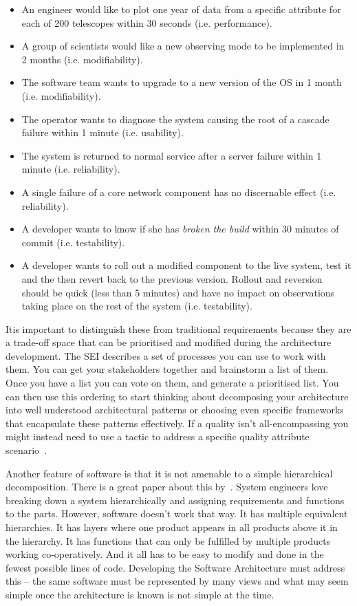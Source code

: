 \documentclass[11pt,twoside]{article}
\begin{document}
\begin{itemize}
	\item An engineer would like to plot one year of data from a specific attribute for each 
of 200 telescopes within 30 seconds (i.e. performance).
	\item A group of scientists would like a new observing mode to be implemented in 2 
months (i.e. modifiability). 
	\item The software team wants to upgrade to a new version of the OS in 1 month (i.e. 
modifiability). 
	\item The operator wants to diagnose the system causing the root of a cascade failure 
within 1 minute (i.e. usability). 
	\item The system is returned to normal service after a server failure within 1 minute 
(i.e. reliability). 
	\item A single failure of a core network component has no discernable effect (i.e. reliability). 
	\item A developer wants to know if she has \emph{broken the build} within 30 minutes of 
commit (i.e. testability).
	\item A developer wants to roll out a modified component to the live system, test it 
and the then revert back to the previous version. Rollout and reversion should be 
quick (less than 5 minutes) and have no impact on observations taking place on 
the rest of the system (i.e. testability). 
\end{itemize}

Itis important to distinguish these from traditional requirements because they are a 
trade-off space that can be prioritised and modified during the architecture development. 
The SEI describes a set of processes you can use to work with them. You can get your 
stakeholders together and brainstorm a list of them. Once you have a list you can vote 
on them, and generate a prioritised list. You can then use this ordering to start thinking 
about decomposing your architecture into well understood architectural patterns or 
choosing even specific frameworks that encapsulate these patterns effectively. If a quality 
isn't all-encompassing you might instead need to use a tactic to address a specific 
quality attribute scenario~\citep[see][]{clements2001,bass2012,cervantes2016}. 

Another feature of software is that it is not amenable to a simple hierarchical decomposition. 
There is a great paper about this by~\citet{maier2006}. System 
engineers love breaking down a system hierarchically and assigning requirements and 
functions to the parts. However, software doesn't work that way. It has multiple equivalent 
hierarchies. It has layers where one product appears in all products above it in 
the hierarchy. It has functions that can only be fulfilled by multiple products working 
co-operatively. And it all has to be easy to modify and done in the fewest possible lines 
of code. Developing the Software Architecture must address this -- the same software 
must be represented by many views and what may seem simple once the architecture is 
known is not simple at the time. 
\end{document}
